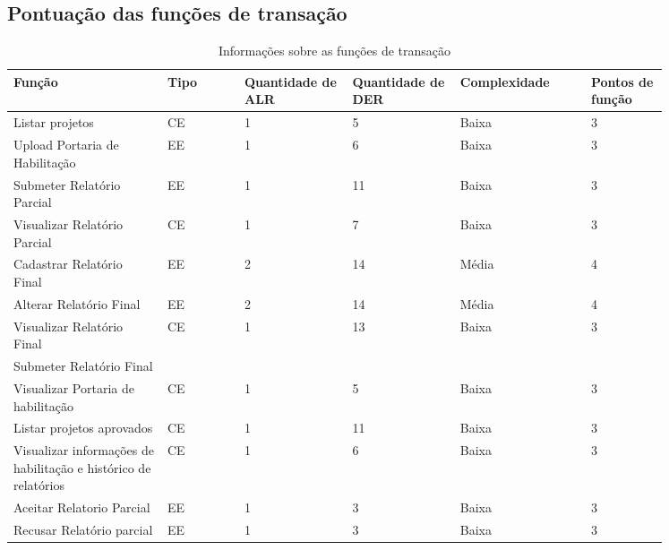     
  
   \subsection{Pontuação das funções de transação}
   
	\begin{table*}[!h]
	\centering
	\caption{Informações sobre as funções de transação}
	\label{funcoes_transacao}
	  \begin{tabular}{p{0.20\linewidth}p{0.10\linewidth}p{0.14\linewidth}p{0.14\linewidth}p{0.17\linewidth}p{0.10\linewidth}}
	\hline
	\textbf{Função} & \textbf{Tipo} & \textbf{Quantidade de ALR} & \textbf{Quantidade de DER} & \textbf{Complexidade} & \textbf{Pontos de função} \\
	\hline
	Listar projetos & CE & 1 & 5 & Baixa & 3 \\
	\hline
	Upload Portaria de Habilitação & EE & 1 & 6 & Baixa & 3 \\
	\hline
	Submeter Relatório Parcial & EE & 1 & 11 & Baixa & 3 \\
	\hline
	Visualizar Relatório Parcial & CE & 1 & 7 & Baixa & 3 \\
	\hline
	Cadastrar Relatório Final & EE & 2 & 14 & Média & 4 \\
	\hline
	Alterar Relatório Final & EE & 2 & 14 & Média & 4 \\
	\hline
	Visualizar Relatório Final & CE & 1 & 13 & Baixa & 3 \\
	\hline
	Submeter Relatório Final &  &  &  &  &  \\
	\hline
	Visualizar Portaria de habilitação & CE & 1 & 5 & Baixa & 3 \\
	\hline
	Listar projetos aprovados & CE & 1 & 11 & Baixa & 3 \\
	\hline
	Visualizar informações de habilitação e histórico de relatórios & CE & 1 & 6 & Baixa & 3 \\
	\hline
	Aceitar Relatorio Parcial & EE & 1 & 3 & Baixa & 3 \\
	\hline
	Recusar Relatório parcial & EE & 1 & 3 & Baixa & 3\\
	\end{tabular}
	\end{table*}

